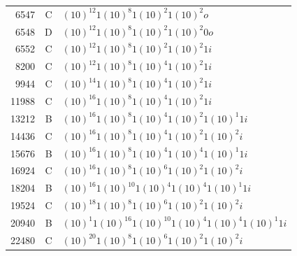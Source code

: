 \documentclass[12pt]{article}
\begin{document}
\begin{table}[H]
\begin{Parallel}[c]{0.48\textwidth}{0.48\textwidth}
{{\begin{scriptsize}
\begin{tabular}{rrl}
6547&C&$(10)^{12}1(10)^{8}1(10)^{2}1(10)^{2}o$\\
6548&D&$(10)^{12}1(10)^{8}1(10)^{2}1(10)^{2}0o$\\
6552&C&$(10)^{12}1(10)^{8}1(10)^{2}1(10)^{2}1i$\\
8200&C&$(10)^{12}1(10)^{8}1(10)^{4}1(10)^{2}1i$\\
9944&C&$(10)^{14}1(10)^{8}1(10)^{4}1(10)^{2}1i$\\
11988&C&$(10)^{16}1(10)^{8}1(10)^{4}1(10)^{2}1i$\\
13212&B&$(10)^{16}1(10)^{8}1(10)^{4}1(10)^{2}1(10)^{1}1i$\\
14436&C&$(10)^{16}1(10)^{8}1(10)^{4}1(10)^{2}1(10)^{2}i$\\
15676&B&$(10)^{16}1(10)^{8}1(10)^{4}1(10)^{4}1(10)^{1}1i$\\
16924&C&$(10)^{16}1(10)^{8}1(10)^{6}1(10)^{2}1(10)^{2}i$\\
18204&B&$(10)^{16}1(10)^{10}1(10)^{4}1(10)^{4}1(10)^{1}1i$\\
19524&C&$(10)^{18}1(10)^{8}1(10)^{6}1(10)^{2}1(10)^{2}i$\\
20940&B&$(10)^{1}1(10)^{16}1(10)^{10}1(10)^{4}1(10)^{4}1(10)^{1}1i$\\
22480&C&$(10)^{20}1(10)^{8}1(10)^{6}1(10)^{2}1(10)^{2}i$\\
\end{tabular}
\end{scriptsize}}}
\end{Parallel}
\end{table}
\end{document}
